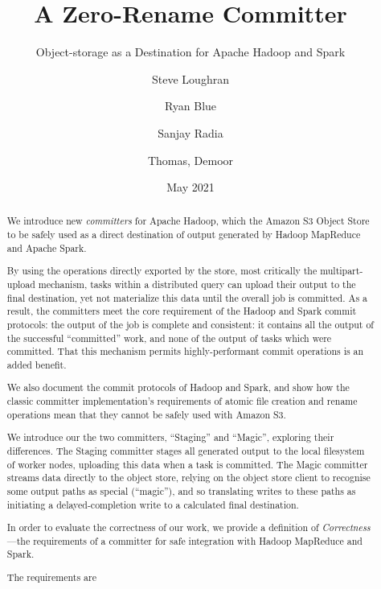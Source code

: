 \documentclass[format=acmsmall, screen=true, nonacm, timestamp, review=false]{acmart}
\title{A Zero-Rename Committer}
\subtitle{Object-storage as a Destination for Apache Hadoop and Spark}
\author{Steve Loughran}
\affiliation{Cloudera}
\author{Ryan Blue}
\affiliation{Netflix}
\author{Sanjay Radia}
\affiliation{Cloudera}
\author{Thomas, Demoor}
\affiliation{Western Digital}
\date{May 2021}
\begin{document}

\begin{abstract}

We introduce new \emph{committers} for Apache Hadoop, which
the Amazon S3 Object Store to be safely used as a direct destination of output generated
by Hadoop MapReduce and Apache Spark.

By using the operations directly exported by the store,
most critically the multipart-upload mechanism, tasks within a distributed
query can upload their output to the final destination,
yet not materialize this data until the overall job is committed.
As a result, the committers meet the core requirement of the Hadoop and Spark commit
protocols: the output of the job is complete and consistent: it contains
all the output of the successful ``committed'' work, and none of the output of
tasks which were committed.
That this mechanism permits highly-performant commit operations is an added benefit.

We also document the commit protocols of Hadoop and Spark, and show how the classic committer
implementation's requirements of atomic file creation and rename operations mean that they
cannot be safely used with Amazon S3.

We introduce our the two committers, ``Staging'' and ``Magic'', exploring their differences.
The Staging committer stages all generated output to the local filesystem of
worker nodes, uploading this data when a task is committed.
The Magic committer streams data directly to the object store, relying on the
object store client to recognise some output paths as special (``magic''), and
so translating writes to these paths as initiating a delayed-completion write
to a calculated final destination.

In order to evaluate the correctness of our work, we provide a definition
of \emph{Correctness} ---the requirements of a committer for safe integration
with Hadoop MapReduce and Spark.

The requirements are





\end{abstract}
\end{document}

